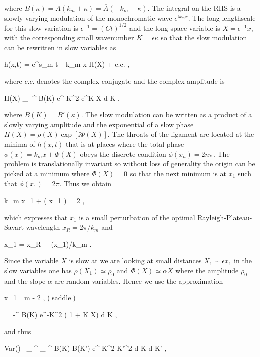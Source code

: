 where $B(\kappa) = A(k_m + \kappa) = \overline A(-k_m -\kappa)$.
The integral on the RHS is a slowly varying modulation of the monochromatic wave $e^{\ii k_m x}$. 
The long lengthscale for this slow variation is $\epsilon^{-1} = (C t)^{1/2}$ and 
the long space variable is $X = \epsilon^{-1} x$, with the corresponding small 
wavenumber $K = \epsilon \kappa$ so that the slow modulation can be rewritten in slow variables as

\be
h(x,t) =   e^{s_m t +\ii k_m x} H(X)  + c.c. \label{slowamp} , 
\nd

where $c.c.$ denotes the complex conjugate and the complex amplitude is

\be
H(X) \simeq \int_{- \infty}^{\infty}  B(K) e^{-K^2}  e^{\ii K X} {\textrm{d}} K \label{saddle} , 
\nd

where $B(K) = B'(\kappa)$. 
The slow modulation can be written as a product of a slowly varying amplitude 
and the exponential of a slow phase $H(X) = \rho(X) \exp [{ \ii \Phi(X) }]$. 
The throats of the  ligament are located at the minima of
$h(x,t)$ that is at places where the total phase
$\phi(x) =  k_m x + \Phi ( X) $ obeys the discrete condition $ \phi(x_n) = 2 n \pi $.
The problem is translationally invariant so without loss of generality the origin can be picked
at a minimum where $\Phi(X) = 0$ so that the next minimum is at $x_1$ such that  $\phi(x_1)= 2 \pi$.
Thus we obtain 

\be
k_m x_1 + \Phi ( \epsilon x_1 ) = 2 \pi , 
\nd

which expresses that $x_1$ is a small perturbation of the optimal Rayleigh-Plateau-Savart wavelength
$x_{R} = 2 \pi / k_m$ and

\be
x_1 = x_R + \Phi(\epsilon x_1)/k_m . 
\nd

Since the variable $X$ is slow at we are looking at small 
distances $X_1 \sim \epsilon x_1$ in the slow variables
one has $\rho(X_1) \simeq \rho_0$ and  $\Phi(X) \simeq \alpha X$ where 
the amplitude $\rho_0$ and the slope $\alpha$ are random
variables. Hence we use the approximation  

\be
x_1 \simeq \lambda_m -  2 \pi \alpha \epsilon  \label{x1a} , 
\nd
(\ref{saddle})

\be
\rho [ 1 + \ii \alpha X] \simeq \int_{-\infty}^{\infty}  B(K) e^{-K^2} ( 1 + \ii K X)  {\textrm{d}} K ,
\nd

and thus

\be
Var(\rho)  \simeq \int_{-\infty}^{\infty} \int_{-\infty}^{\infty}  B(K) B(K') e^{-K^2-K'^2}  {\textrm{d}} K  {\textrm{d}} K'  , 
\nd

